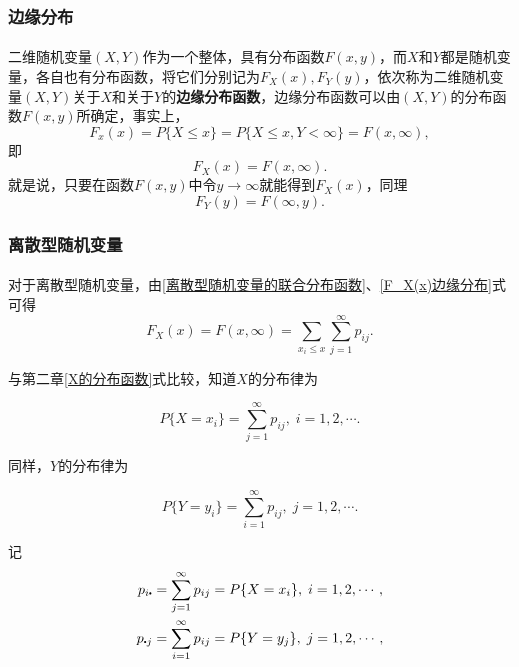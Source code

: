 \subsubsection{边缘分布}
\paragraph{}
二维随机变量$(X,Y)$作为一个整体，具有分布函数$F(x,y)$，而$X$和$Y$都是随机变量，各自也有分布函数，将它们分别记为$F_X(x), F_Y(y)$，依次称为二维随机变量$(X,Y)$关于$X$和关于$Y$的\textbf{边缘分布函数}，边缘分布函数可以由$(X,Y)$的分布函数$F(x,y)$所确定，事实上，
\begin{equation}
  F_x(x) = P\{X\leq x\} = P\{X\leq x, Y < \infty\} = F(x,\infty),
\end{equation}
即
\begin{equation}
  \label{F_X(x)边缘分布}
  F_X(x)=F(x,\infty).
\end{equation}
就是说，只要在函数$F(x,y)$中令$y \to \infty$就能得到$F_X(x)$，同理
\begin{equation}
  F_Y(y) = F(\infty,y).
\end{equation}

\subsubsection{离散型随机变量}
\paragraph{}
对于离散型随机变量，由\eqref{离散型随机变量的联合分布函数}、\eqref{F_X(x)边缘分布}式可得
\begin{equation}
  F_X(x)=F(x,\infty)=\sum_{x_i \leq x}\sum_{j=1}^\infty p_{ij}.
\end{equation}

与第二章\eqref{X的分布函数}式比较，知道$X$的分布律为

\begin{equation}
  P\{X=x_i\} = \sum_{j=1}^\infty p_{ij}, \; i = 1, 2, \cdots.
\end{equation}

同样，$Y$的分布律为

\begin{equation}
  P\{Y=y_i\} = \sum_{i=1}^\infty p_{ij}, \; j = 1, 2, \cdots.
\end{equation}

记
\begin{align}
\begin{split}
  p_{i\bigcdot} &= \sum_{j=1}^\infty p_{ij} = P\{X=x_i\}, \; i = 1,2,\cdots, \\
  p_{\bigcdot j} &= \sum_{i=1}^\infty p_{ij} = P\{Y=y_j\}, \; j = 1,2,\cdots,
\end{split}
\end{align}

